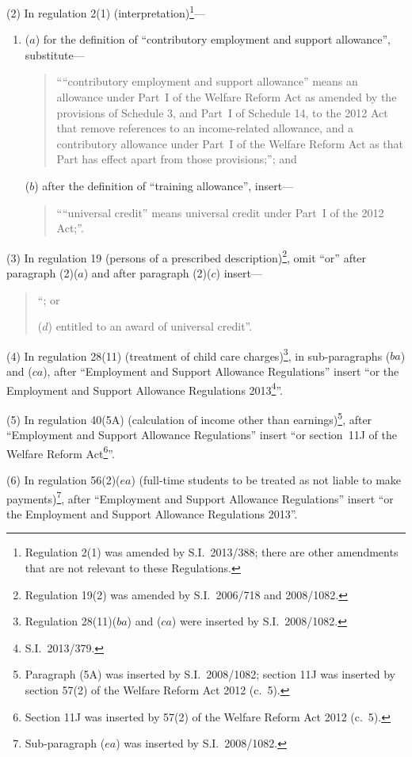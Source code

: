 \documentclass[12pt,a4paper]{article}
\begin{document}
(2) In regulation 2(1) (interpretation)\footnote{Regulation 2(1) was amended by S.I.~2013/388; there are other amendments that are not relevant to these Regulations.}—
\begin{enumerate}\item[]
($a$) for the definition of “contributory employment and support allowance”, substitute—
\begin{quotation}
““contributory employment and support allowance” means an allowance under Part~I of the Welfare Reform Act as amended by the provisions of Schedule 3, and Part~I of Schedule 14, to the 2012 Act that remove references to an income-related allowance, and a contributory allowance under Part~I of the Welfare Reform Act as that Part has effect apart from those provisions;”; and
\end{quotation}

($b$) after the definition of “training allowance”, insert—
\begin{quotation}
““universal credit” means universal credit under Part~I of the 2012 Act;”.
\end{quotation}
\end{enumerate}

(3) In regulation 19 (persons of a prescribed description)\footnote{Regulation 19(2) was amended by S.I.~2006/718 and 2008/1082.}, omit “or” after paragraph (2)($a$)  and after paragraph (2)($c$)  insert—
\begin{quotation}
“; or

($d$) entitled to an award of universal credit”.
\end{quotation}

(4) In regulation 28(11) (treatment of child care charges)\footnote{Regulation 28(11)($ba$)  and ($ca$)  were inserted by S.I.~2008/1082.}, in sub-\hspace{0pt}paragraphs ($ba$)  and ($ca$), after “Employment and Support Allowance Regulations” insert “or the Employment and Support Allowance Regulations 2013\footnote{S.I.~2013/379.}”.

(5) In regulation 40(5A) (calculation of income other than earnings)\footnote{Paragraph (5A) was inserted by S.I.~2008/1082; section 11J was inserted by section 57(2) of the Welfare Reform Act 2012 (c.~5).}, after “Employment and Support Allowance Regulations” insert “or section~11J of the Welfare Reform Act\footnote{Section 11J was inserted by 57(2) of the Welfare Reform Act 2012 (c.~5).}”.

(6) In regulation 56(2)($ea$)  (full-time students to be treated as not liable to make payments)\footnote{Sub-paragraph ($ea$)  was inserted by S.I.~2008/1082.}, after “Employment and Support Allowance Regulations” insert “or the Employment and Support Allowance Regulations 2013”.
\end{document}
